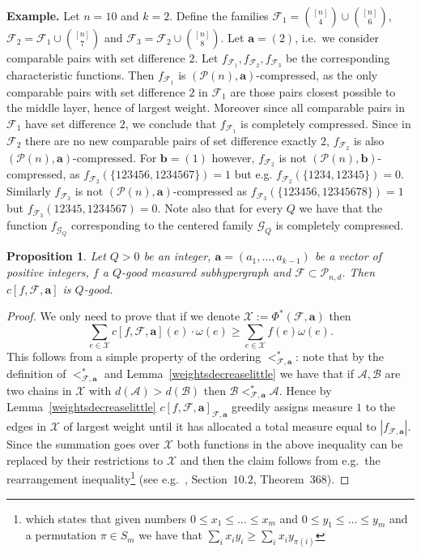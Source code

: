 \documentclass[12pt]{article}
\newtheorem{prop}[theorem]{Proposition}
\numberwithin{equation}{section}
\def\A{\mathcal{A}}
\def\B{\mathcal{B}}
\def\F{\mathcal{F}}
\def\G{\mathcal{G}}
\def\P{\mathcal{P}}
\def\X{\mathcal{X}}
\def\w{\omega}
\begin{document}
\textbf{Example.} Let $n=10$ and $k=2$. Define the families $\F_1=\binom{[n]}{4}\cup \binom{[n]}{6}$, $\F_2=\F_1\cup \binom{[n]}{7}$ and $\F_3=\F_2\cup\binom{[n]}{8}$. Let $\mathbf{a}=(2)$, i.e.~we consider comparable pairs with set difference $2$. Let $f_{\F_1},f_{\F_2},f_{\F_3}$ be the corresponding characteristic functions. Then $f_{\F_1}$ is $(\P(n),\mathbf{a})$-compressed, as the only comparable pairs with set difference $2$ in $\F_1$ are those pairs closest possible to the middle layer, hence of largest weight. Moreover since all comparable pairs in $\F_1$ have set difference $2$, we conclude that $f_{\F_1}$ is completely compressed. Since in $\F_2$ there are no new comparable pairs of set difference exactly $2$, $f_{\F_2}$ is also $(\P(n),\mathbf{a})$-compressed. For $\mathbf{b}=(1)$ however, $f_{\F_2}$ is not $(\P(n),\mathbf{b})$-compressed, as $f_{\F_2}(\{123456,1234567\})=1$ but e.g. $f_{\F_2}(\{1234,12345\})=0$. Similarly $f_{\F_3}$ is not $(\P(n),\mathbf{a})$-compressed as $f_{\F_3}(\{123456,12345678\})=1$ but $f_{\F_3}(12345,1234567)=0$. Note also that for every $Q$ we have that the function $f_{\G_Q}$ corresponding to the centered family $\G_Q$ is completely compressed.

\begin{prop}\label{compressed}
Let $Q>0$ be an integer, $\mathbf{a}=(a_1,\ldots,a_{k-1})$ be a vector of positive integers, $f$ a $Q$-good measured subhypergraph and $\F\subset \P_{n,d}$. Then $c[f,\F,\mathbf{a}]$ is $Q$-good.
\end{prop}
\begin{proof}
We only need to prove that if we denote $\X:=\Phi^*(\F,\mathbf{a})$ then 
$$\sum_{e\in \X}c[f,\F,\mathbf{a}](e)\cdot\w(e)\geq \sum_{e\in \X}f(e)\w(e).$$
This follows from a simple property of the ordering $<^*_{\F,\mathbf{a}}$: note that by the definition of $<^*_{\F,\mathbf{a}}$ and Lemma~\ref{weightsdecreaselittle} we have that if $\A,\B$ are two chains in $\X$ with $d(\A)>d(\B)$ then $\B<^*_{\F,\mathbf{a}}\A$. Hence by Lemma~\ref{weightsdecreaselittle} $c[f,\F,\mathbf{a}]_{\F,\mathbf{a}}$ greedily assigns measure $1$ to the edges in $\X$ of largest weight until it has allocated a total measure equal to $|f_{\F,\mathbf{a}}|$. Since the summation goes over $\X$ both functions in the above inequality can be replaced by their restrictions to $\X$ and then the claim follows from e.g.~the rearrangement inequality\footnote{which states that given numbers $0\leq x_1\leq \ldots \leq x_m$ and $0\leq y_1\leq \ldots\leq y_m$ and a permutation $\pi\in S_m$ we have that $\sum_i x_i y_i \geq \sum_i x_i y_{\pi (i)}$} (see e.g.~\cite{inequalitieshardy},  Section~$10.2$, Theorem~$368$).
\end{proof}
\end{document}
